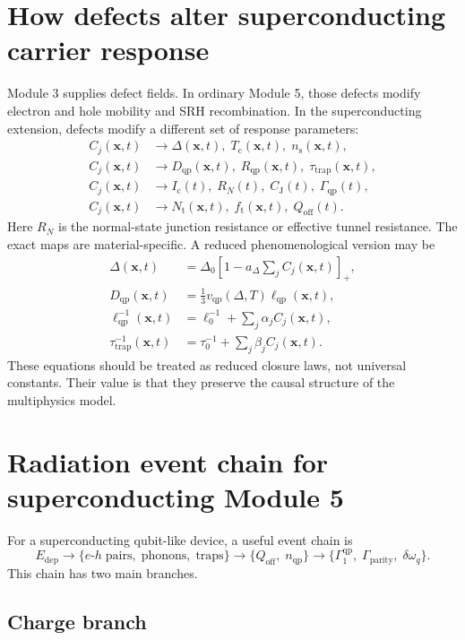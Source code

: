\documentclass[11pt]{article}
\newcommand{\x}{\bm{x}}
\newcommand{\DeltaSC}{\Delta}
\newcommand{\Tc}{T_{\mathrm{c}}}
\newcommand{\Ns}{n_{\mathrm{s}}}
\newcommand{\nqp}{n_{\mathrm{qp}}}
\newcommand{\Dqp}{D_{\mathrm{qp}}}
\newcommand{\Rqp}{R_{\mathrm{qp}}}
\newcommand{\tautrap}{\tau_{\mathrm{trap}}}
\newcommand{\GammaQP}{\Gamma_{\mathrm{qp}}}
\newcommand{\Ic}{I_{\mathrm{c}}}
\newcommand{\CJ}{C_{\mathrm{J}}}
\newcommand{\Qoff}{Q_{\mathrm{off}}}
\newcommand{\Nt}{N_{\mathrm{t}}}
\newcommand{\ft}{f_{\mathrm{t}}}
\begin{document}
\section{How defects alter superconducting carrier response}

Module 3 supplies defect fields. In ordinary Module 5, those defects modify electron and hole mobility and SRH recombination. In the superconducting extension, defects modify a different set of response parameters:
\begin{align}
C_j(\x,t) &\longrightarrow \DeltaSC(\x,t),\; \Tc(\x,t),\; \Ns(\x,t),\\
C_j(\x,t) &\longrightarrow \Dqp(\x,t),\; \Rqp(\x,t),\; \tautrap(\x,t),\\
C_j(\x,t) &\longrightarrow \Ic(t),\; R_N(t),\; \CJ(t),\; \GammaQP(t),\\
C_j(\x,t) &\longrightarrow \Nt(\x,t),\; \ft(\x,t),\; \Qoff(t).
\end{align}
Here \(R_N\) is the normal-state junction resistance or effective tunnel resistance. The exact maps are material-specific. A reduced phenomenological version may be
\begin{align}
\DeltaSC(\x,t) &= \Delta_0\left[1-a_\Delta \sum_j C_j(\x,t)\right]_+,\\
\Dqp(\x,t) &= \frac{1}{3}v_{\mathrm{qp}}(\Delta,T)\ell_{\mathrm{qp}}(\x,t),\\
\ell_{\mathrm{qp}}^{-1}(\x,t) &= \ell_0^{-1}+\sum_j \alpha_j C_j(\x,t),\\
\tautrap^{-1}(\x,t) &= \tau_{0}^{-1}+\sum_j \beta_j C_j(\x,t).
\end{align}
These equations should be treated as reduced closure laws, not universal constants. Their value is that they preserve the causal structure of the multiphysics model.

\section{Radiation event chain for superconducting Module 5}

For a superconducting qubit-like device, a useful event chain is
\begin{equation}
\boxed{E_{\mathrm{dep}} \rightarrow \{e\text{-}h\;\text{pairs},\;\text{phonons},\;\text{traps}\} \rightarrow \{\Qoff,\;\nqp\} \rightarrow \{\Gamma_1^{\mathrm{qp}},\;\Gamma_{\mathrm{parity}},\;\delta\omega_q\}.}
\end{equation}
This chain has two main branches.

\subsection{Charge branch}
\end{document}
